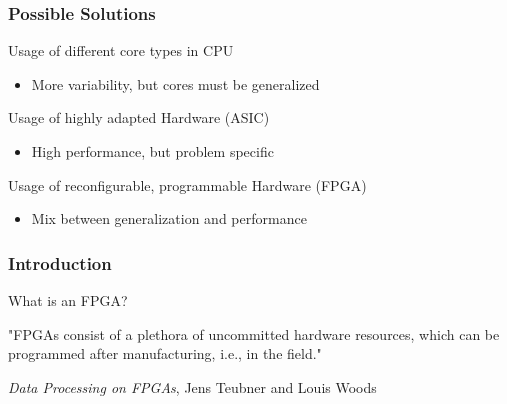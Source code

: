 \documentclass{beamer}
\begin{document}
\begin{frame}
	\frametitle{Possible Solutions}
	Usage of different core types in CPU
	\begin{itemize}
		\item More variability, but cores must be generalized
	\end{itemize}
	\vspace*{0.5cm}%
	Usage of highly adapted Hardware (ASIC)
	\begin{itemize}
		\item High performance, but problem specific
	\end{itemize}
	\vspace*{0.5cm}%
	Usage of reconfigurable, programmable Hardware (FPGA)
	\begin{itemize} 
		\item Mix between generalization and performance
	\end{itemize}
\end{frame}

\begin{frame}
	\frametitle{Introduction}
	\begin{center}
		\huge What is an FPGA?
	\end{center}
	
	"FPGAs consist of a plethora of uncommitted hardware resources, which can be
	programmed after manufacturing, i.e., in the field."
	\vspace*{3cm}
	\begin{center}
		\small \emph{Data Processing on FPGAs}, Jens Teubner and Louis Woods 
	\end{center}
\end{frame}
\end{document}

